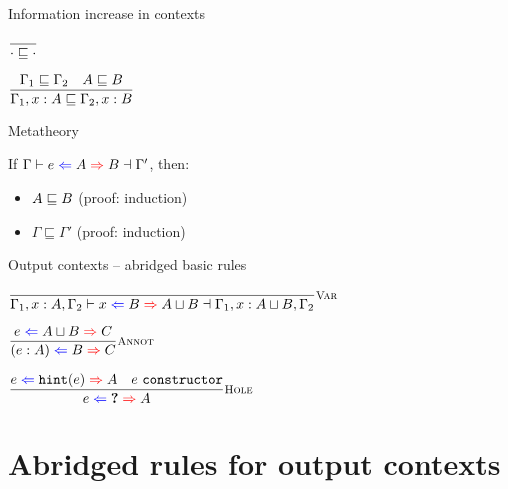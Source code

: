 \documentclass{beamer}
\begin{document}
\newcommand{\ctxorder}[2]{#1 \sqsubseteq #2}

\begin{frame}{Information increase in contexts}

\begin{center}
  $\infrule{}{\ctxorder{\emptytypingctx}{\emptytypingctx}}$

  \vspace{2em}

  $\infrule{\ctxorder{\Gamma_1}{\Gamma_2} \quad \hintorder{A}{B}}{\ctxorder{\extend{\Gamma_1}{x}{A}}{\extend{\Gamma_2}{x}{B}}}$
\end{center}

\end{frame}

\begin{frame}{Metatheory}

If $\fulloutctx{\Gamma}{e}{A}{B}{\Gamma'}$, then:

\begin{itemize}
  \item $A \sqsubseteq B$ (proof: induction)
  \item $\ctxorder{\Gamma}{\Gamma'}$ (proof: induction)
\end{itemize}

\end{frame}

\begin{frame}{Output contexts -- abridged basic rules}

\begin{center}
  $\infrule[Var]{}{\fulloutctx{\Gamma_1, x : A, \Gamma_2}{x}{B}{\hintlub{A}{B}}{\Gamma_1, x : \hintlub{A}{B}, \Gamma_2}}$

  \vspace{2em}

  $\infrule[Annot]{\shortoutctx{e}{\hintlub{A}{B}}{C}}{\shortoutctx{\annot{e}{A}}{B}{C}}$

  \vspace{2em}

  $\infrule[Hole]{\shortoutctx{e}{\hintfor{e}}{A} \quad \sidecond{e\ \texttt{constructor}}}{\shortoutctx{e}{\Hole}{A}}$
\end{center}

\end{frame}

\section{Abridged rules for output contexts}
\end{document}

